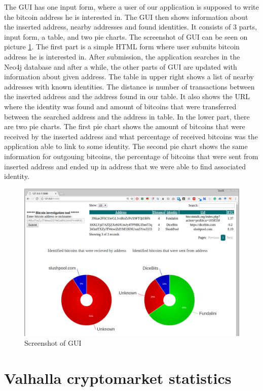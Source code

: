 \documentclass[
  digital, %
  table,   %
  lof,     %
  lot,     %
  oneside
]{fithesis3}
\begin{document}
The GUI has one input form, where a user of our application is supposed to write the bitcoin address he is interested in.
The GUI then shows information about the inserted address, nearby addresses and found identities.
It consists of 3 parts, input form, a table, and two pie charts. The screenshot of GUI can be seen on picture \ref{guiscreen}.
The first part is a simple HTML form where user submits bitcoin address he is interested in.
After submission, the application searches in the Neo4j database and after a while,
the other parts of GUI are updated with information about given address.
The table in upper right shows a list of nearby addresses with known identities. The distance is number of transactions
between the inserted address and the address found in our table. It also shows the URL where the identity was found
and amount of bitcoins that were transferred between the searched address and the address in table.
In the lower part, there are two pie charts. The first pie chart shows the amount of bitcoins that were received by the inserted address
and what percentage of received bitcoins was the application able to link to some identity.
The second pie chart shows the same information for outgouing bitcoins, the percentage of bitcoins that were sent from inserted address
and ended up in address that we were able to find associated identity.

\begin{figure}[!htb]
\hspace*{-1cm}
    \centering
    \includegraphics[width=1\textwidth]{shot}
    \caption{Screenshot of GUI}
    \label{guiscreen}
\end{figure}

\chapter{Valhalla cryptomarket statistics}
\label{stats}
\end{document}
